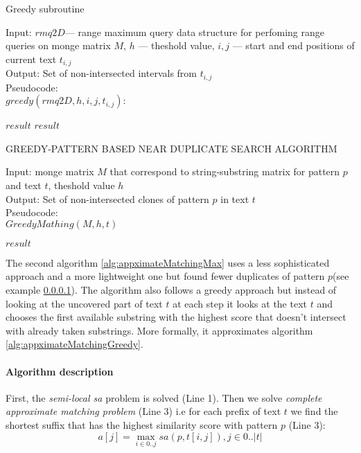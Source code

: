 \begin{algorithm}[H]
\caption{Greedy subroutine}
\label{alg:rec}
Input: $rmq2D$--- range maximum query data structure for perfoming range queries on monge matrix $M$, $h$ --- theshold value, $i,j$ --- start and end positions of current text $t_{i,j}$ \\
Output: Set of non-intersected intervals from $t_{i,j}$\\
Pseudocode:\\
$greedy(rmq2D,h, i, j, t_{i,j} ):$

\begin{algorithmic}[1]
\RETURN $result$
\ENDIF
{}
\ENDIF
{}
\ENDIF
\RETURN $result$
\end{algorithmic}
\end{algorithm}


\begin{algorithm}[H]
\caption{GREEDY-PATTERN BASED NEAR DUPLICATE
SEARCH ALGORITHM}
\label{alg:appximateMatchingGreedy}
Input: monge matrix $M$ that correspond to string-substring matrix 
for pattern $p$ and text $t$, theshold value $h$\\
Output: Set of non-intersected clones of pattern $p$ in text $t$\\
Pseudocode:\\
$GreedyMathing(M,h,t)$
\begin{algorithmic}[1]
\RETURN $result$
\end{algorithmic}
\end{algorithm}


The second algorithm \ref{alg:appximateMatchingMax} uses a less sophisticated approach and a more lightweight one but found fewer duplicates of pattern $p$(see example \ref{}).
The algorithm also follows a greedy approach but instead of looking at the uncovered part of text $t$ at each step it looks at the text $t$ and chooses the first available substring with the highest score that doesn't intersect with already taken substrings.
More formally, it approximates algorithm \ref{alg:appximateMatchingGreedy}.

\paragraph{Algorithm description}
First, the \emph{semi-local sa} problem is solved (Line 1).
Then we solve \emph{complete approximate matching problem} (Line 3) i.e
for each prefix of text $t$ we find the shortest suffix that has the highest similarity score with pattern $p$ (Line 3):
\begin{equation}
    a[j] = \max _{i \in 0 ..j} sa(p,t[i,j]), j \in 0..|t|
\end{equation}

